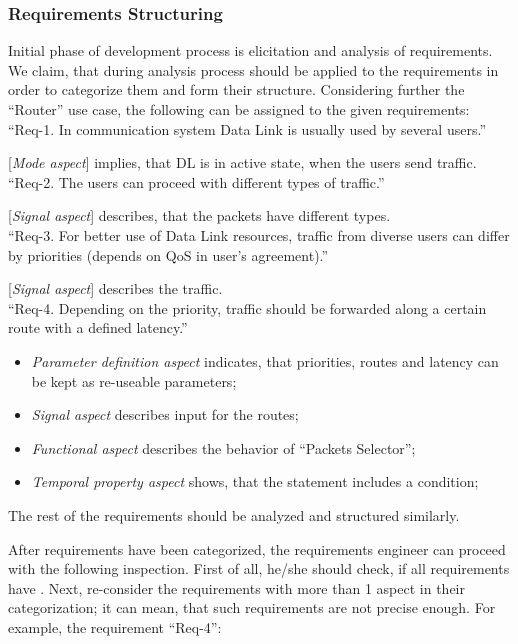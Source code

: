 \normalsize 
\subsubsection{Requirements Structuring}
\label{sec:reqstruct}
Initial phase of development process is elicitation and analysis of requirements. We claim, that during analysis process \asp should be applied to the requirements in order to categorize them and form their structure. Considering further the ``Router'' use case, the following \asp can be assigned to the given requirements:\\

\small ``Req-1.	In communication system Data Link is usually used by several users.''

\normalsize[\textit{Mode aspect}] implies, that DL is in active state, when the users send traffic.\\

\small ``Req-2.	The users can proceed with different types of traffic.''

\normalsize [\textit{Signal aspect}] describes, that the packets have different types.\\

\small ``Req-3.	For better use of Data Link resources, traffic from diverse users can differ by priorities (depends on QoS in user's agreement).''

\normalsize [\textit{Signal aspect}] describes the traffic.\\

\small ``Req-4.	Depending on the priority, traffic should be forwarded along a certain route with a defined latency.'' 

\normalsize \begin{itemize}
	\item \textit{Parameter definition aspect} indicates, that priorities, routes and latency can be kept as re-useable parameters;
	\item \textit{Signal aspect} describes input for the routes;
	\item \textit{Functional aspect} describes the behavior of ``Packets Selector'';
	\item \textit{Temporal property aspect} shows, that the statement includes a condition;
\end{itemize}

The rest of the requirements should be analyzed and structured similarly.

After requirements have been categorized, the requirements engineer can proceed with the following inspection. First of all, he/she should check, if all requirements have \asp. Next, re-consider the requirements with more than 1 aspect in their categorization; it can mean, that such requirements are not precise enough. For example, the requirement ``Req-4'':\\

